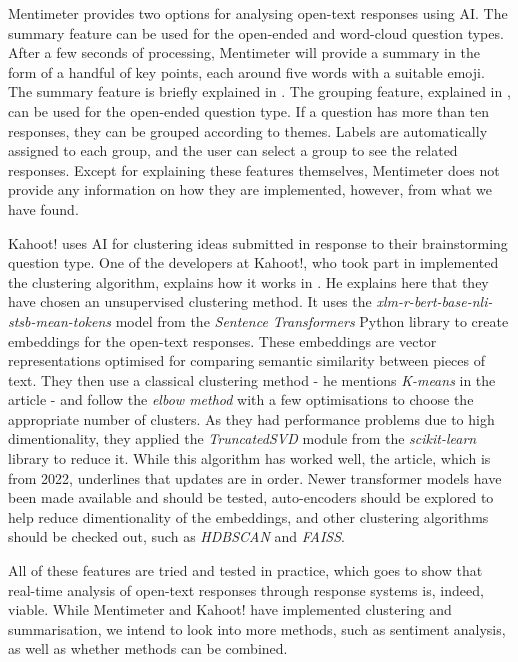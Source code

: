 Mentimeter provides two options for analysing open-text responses using AI. The summary feature can be used for the open-ended and word-cloud question types. After a few seconds of processing, Mentimeter will provide a summary in the form of a handful of key points, each around five words with a suitable emoji. The summary feature is briefly explained in \cite{mentisummary}. The grouping feature, explained in \cite{mentigrouping}, can be used for the open-ended question type. If a question has more than ten responses, they can be grouped according to themes. Labels are automatically assigned to each group, and the user can select a group to see the related responses. Except for explaining these features themselves, Mentimeter does not provide any information on how they are implemented, however, from what we have found.

Kahoot! uses AI for clustering ideas submitted in response to their brainstorming question type. One of the developers at Kahoot!, who took part in implemented the clustering algorithm, explains how it works in \cite{kahootclustering}. He explains here that they have chosen an unsupervised clustering method. It uses the \textit{xlm-r-bert-base-nli-stsb-mean-tokens} model from the \textit{Sentence Transformers} Python library to create embeddings for the open-text responses. These embeddings are vector representations optimised for comparing semantic similarity between pieces of text. They then use a classical clustering method - he mentions \textit{K-means} in the article - and follow the \textit{elbow method} with a few optimisations to choose the appropriate number of clusters. As they had performance problems due to high dimentionality, they applied the \textit{TruncatedSVD} module from the \textit{scikit-learn} library to reduce it. While this algorithm has worked well, the article, which is from 2022, underlines that updates are in order. Newer transformer models have been made available and should be tested, auto-encoders should be explored to help reduce dimentionality of the embeddings, and other clustering algorithms should be checked out, such as \textit{HDBSCAN} and \textit{FAISS}.

All of these features are tried and tested in practice, which goes to show that real-time analysis of open-text responses through response systems is, indeed, viable. While Mentimeter and Kahoot! have implemented clustering and summarisation, we intend to look into more methods, such as sentiment analysis, as well as whether methods can be combined.

